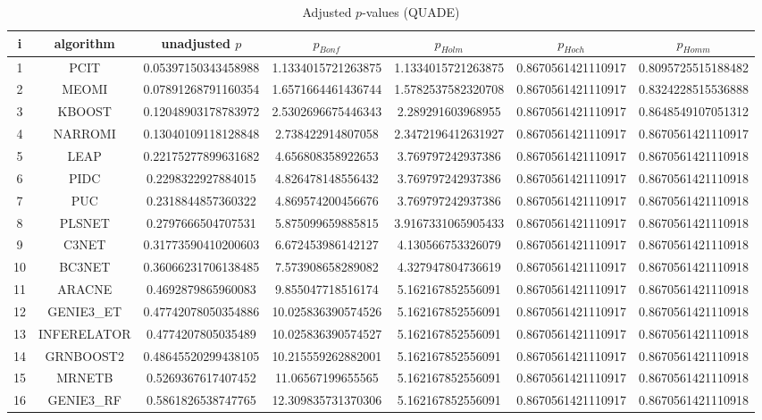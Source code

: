 \documentclass[a4paper,10pt]{article}
\begin{document}
\begin{landscape}
\begin{table}[!htp]
\centering\scriptsize
\caption{Adjusted $p$-values (QUADE)}
\begin{tabular}{ccccccc}
i&algorithm&unadjusted $p$&$p_{Bonf}$&$p_{Holm}$&$p_{Hoch}$&$p_{Homm}$\\
\hline
1&PCIT&0.05397150343458988&1.1334015721263875&1.1334015721263875&0.8670561421110917&0.8095725515188482\\
2&MEOMI&0.07891268791160354&1.6571664461436744&1.5782537582320708&0.8670561421110917&0.8324228515536888\\
3&KBOOST&0.12048903178783972&2.5302696675446343&2.289291603968955&0.8670561421110917&0.8648549107051312\\
4&NARROMI&0.13040109118128848&2.738422914807058&2.3472196412631927&0.8670561421110917&0.8670561421110917\\
5&LEAP&0.22175277899631682&4.656808358922653&3.769797242937386&0.8670561421110917&0.8670561421110918\\
6&PIDC&0.2298322927884015&4.826478148556432&3.769797242937386&0.8670561421110917&0.8670561421110918\\
7&PUC&0.2318844857360322&4.869574200456676&3.769797242937386&0.8670561421110917&0.8670561421110918\\
8&PLSNET&0.2797666504707531&5.875099659885815&3.9167331065905433&0.8670561421110917&0.8670561421110918\\
9&C3NET&0.31773590410200603&6.672453986142127&4.130566753326079&0.8670561421110917&0.8670561421110918\\
10&BC3NET&0.36066231706138485&7.573908658289082&4.327947804736619&0.8670561421110917&0.8670561421110918\\
11&ARACNE&0.4692879865960083&9.855047718516174&5.162167852556091&0.8670561421110917&0.8670561421110918\\
12&GENIE3_ET&0.47742078050354886&10.025836390574526&5.162167852556091&0.8670561421110917&0.8670561421110918\\
13&INFERELATOR&0.4774207805035489&10.025836390574527&5.162167852556091&0.8670561421110917&0.8670561421110918\\
14&GRNBOOST2&0.48645520299438105&10.215559262882001&5.162167852556091&0.8670561421110917&0.8670561421110918\\
15&MRNETB&0.5269367617407452&11.06567199655565&5.162167852556091&0.8670561421110917&0.8670561421110918\\
16&GENIE3_RF&0.5861826538747765&12.309835731370306&5.162167852556091&0.8670561421110917&0.8670561421110918\\

\end{tabular}
\end{table}
\end{landscape}
\end{document}
